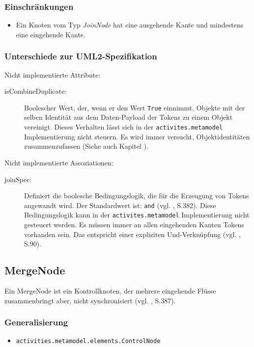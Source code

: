 \subsubsection{Einschränkungen}
\begin{itemize}
\item Ein Knoten vom Typ \emph{JoinNode} hat eine ausgehende Kante und mindestens eine eingehende Kante.
\end{itemize}

\subsubsection{Unterschiede zur UML2-Spezifikation}

Nicht implementierte Attribute:
\begin{description}
\item[isCombineDuplicate:] Boolescher Wert, der, wenn er den Wert \texttt{True} einnimmt, Objekte mit der selben Identität aus dem Daten-Payload der Tokens zu einem Objekt vereinigt. Dieses Verhalten lässt sich in der \texttt{activites.metamodel} Implementierung nicht steuern. Es wird immer versucht, Objektidentitäten zusammenzufassen (Siehe auch Kapitel ).
\end{description}

Nicht implementierte Assoziationen:
\begin{description}
\item[joinSpec:] Definiert die boolesche Bedingungslogik, die für die Erzeugung von Tokens angewandt wird. Der Standardwert ist: \texttt{and} (vgl. \citep{OMG2009}, S.382). Diese Bedingungslogik kann in der \texttt{activites.metamodel} Implementierung nicht gesteuert werden. Es müssen immer an allen eingehenden Kanten Tokens vorhanden sein. Das entspricht einer expliziten Und-Verknüpfung (vgl. \citep{WeilkiensOestereich2004}, S.90).
\end{description}


\subsection{MergeNode}
\label{meta-merge}
Ein MergeNode ist ein Kontrollknoten, der mehrere eingehende Flüsse zusammenbringt aber, nicht synchronisiert (vgl. \citep{OMG2009}, S.387).

\subsubsection{Generalisierung}
\begin{itemize}
\item \texttt{activities.metamodel.elements.ControlNode}
\end{itemize}

